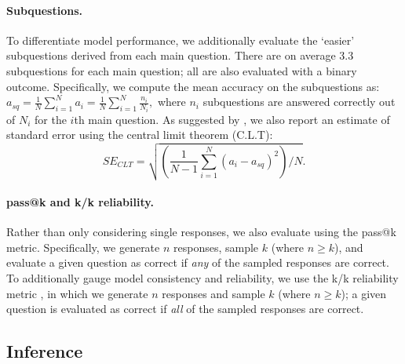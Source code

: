 \paragraph{Subquestions.} To differentiate model performance, we additionally evaluate the `easier' subquestions derived from each main question. There are on average 3.3 subquestions for each main question; all are also evaluated with a binary outcome. Specifically, we compute the mean accuracy on the subquestions as: \begin{math}a_{sq} = \frac{1}{N}\sum_{i=1}^{N} a_i = \frac{1}{N}\sum_{i=1}^{N} \frac{n_i}{N_i},\end{math} where $n_i$ subquestions are answered correctly out of $N_i$ for the $i$th main question. As suggested by \citet{miller2024adding}, we also report an estimate of standard error using the central limit theorem (C.L.T): \begin{equation*}
SE_{CLT} = \sqrt{\left(\frac{1}{N-1} \sum_{i=1}^{N}{(a_i - a_{sq})^2}\right)/N}.
\end{equation*}

\paragraph{pass@k and k/k reliability.} Rather than only considering single responses, we also evaluate using the pass@k metric. Specifically, we generate $n$ responses, sample $k$ (where $n\geq k$), and evaluate a given question as correct if \textit{any} of the sampled responses are correct. To additionally gauge model consistency and reliability, we use the k/k reliability metric \cite{OpenAI2024o1pro}, in which we generate $n$ responses and sample $k$ (where $n\geq k$); a given question is evaluated as correct if \textit{all} of the sampled responses are correct.

\subsection{Inference}

